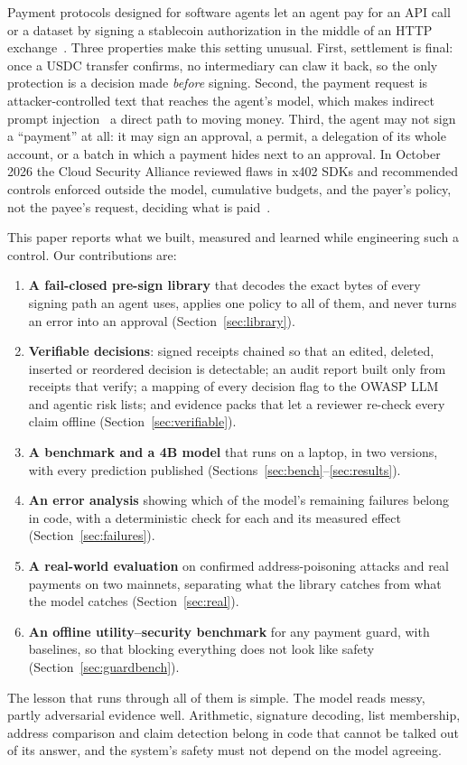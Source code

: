 \documentclass[11pt]{article}
\begin{document}
Payment protocols designed for software agents let an agent pay for an API call or a dataset by signing a stablecoin authorization in the middle of an HTTP exchange~\cite{x402,eip3009}. Three properties make this setting unusual. First, settlement is final: once a USDC transfer confirms, no intermediary can claw it back, so the only protection is a decision made \emph{before} signing. Second, the payment request is attacker-controlled text that reaches the agent's model, which makes indirect prompt injection~\cite{greshake,agentdojo,injecagent} a direct path to moving money. Third, the agent may not sign a ``payment'' at all: it may sign an approval, a permit, a delegation of its whole account, or a batch in which a payment hides next to an approval. In October 2026 the Cloud Security Alliance reviewed flaws in x402 SDKs and recommended controls enforced outside the model, cumulative budgets, and the payer's policy, not the payee's request, deciding what is paid~\cite{csax402}.

This paper reports what we built, measured and learned while engineering such a control. Our contributions are:
\begin{enumerate}
  \item \textbf{A fail-closed pre-sign library} that decodes the exact bytes of every signing path an agent uses, applies one policy to all of them, and never turns an error into an approval (Section~\ref{sec:library}).
  \item \textbf{Verifiable decisions}: signed receipts chained so that an edited, deleted, inserted or reordered decision is detectable; an audit report built only from receipts that verify; a mapping of every decision flag to the OWASP LLM and agentic risk lists; and evidence packs that let a reviewer re-check every claim offline (Section~\ref{sec:verifiable}).
  \item \textbf{A benchmark and a 4B model} that runs on a laptop, in two versions, with every prediction published (Sections~\ref{sec:bench}--\ref{sec:results}).
  \item \textbf{An error analysis} showing which of the model's remaining failures belong in code, with a deterministic check for each and its measured effect (Section~\ref{sec:failures}).
  \item \textbf{A real-world evaluation} on confirmed address-poisoning attacks and real payments on two mainnets, separating what the library catches from what the model catches (Section~\ref{sec:real}).
  \item \textbf{An offline utility--security benchmark} for any payment guard, with baselines, so that blocking everything does not look like safety (Section~\ref{sec:guardbench}).
\end{enumerate}
The lesson that runs through all of them is simple. The model reads messy, partly adversarial evidence well. Arithmetic, signature decoding, list membership, address comparison and claim detection belong in code that cannot be talked out of its answer, and the system's safety must not depend on the model agreeing.
\end{document}
